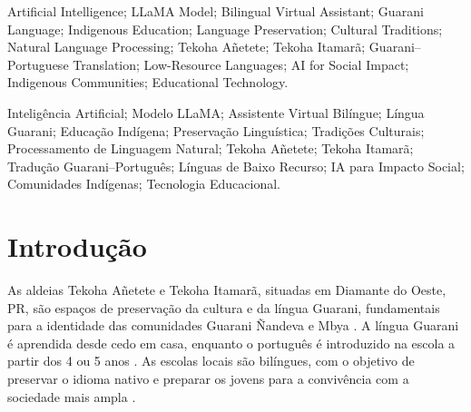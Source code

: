 \documentclass[10pt,conference]{IEEEtran}
\begin{document}
\renewcommand{\IEEEkeywordsname}{Keywords}
\begin{IEEEkeywords}
Artificial Intelligence; LLaMA Model; Bilingual Virtual Assistant; Guarani Language; Indigenous Education; Language Preservation; Cultural Traditions; Natural Language Processing; Tekoha Añetete; Tekoha Itamarã; Guarani–Portuguese Translation; Low-Resource Languages; AI for Social Impact; Indigenous Communities; Educational Technology.
\end{IEEEkeywords}

\renewcommand{\abstractname}{Resumo}

\begin{abstract}
O desenvolvimento da Inteligência Artificial está modificando a forma como as pessoas interagem com a tecnologia. Em todos os lugares, há uma enxurrada de modelos treinados e disponíveis para uso. Diante dos desafios enfrentados pelas comunidades indígenas, em especial a preservação da língua e das tradições culturais, surge a oportunidade de utilizar a IA, como o modelo LLaMA, no ensino e na preservação da língua e cultura indígena \cite{deferia2024uso}. Este estudo explora o uso do LLaMA no desenvolvimento de um assistente virtual bilíngue (Guarani-Português) dedicado à língua e às tradições Guarani com o objetivo de apoiar o ensino de crianças e jovens, com foco nas aldeias Tekoha Añetete e Tekoha Itamarã, localizadas em Diamante do Oeste, Paraná \cite{cabral2016guarani, kuhl2013etno}.
\end{abstract}

\renewcommand\IEEEkeywordsname{Palavras-chave}

\begin{IEEEkeywords}
Inteligência Artificial; Modelo LLaMA; Assistente Virtual Bilíngue; Língua Guarani; Educação Indígena; Preservação Linguística; Tradições Culturais; Processamento de Linguagem Natural; Tekoha Añetete; Tekoha Itamarã; Tradução Guarani–Português; Línguas de Baixo Recurso; IA para Impacto Social; Comunidades Indígenas; Tecnologia Educacional.
\end{IEEEkeywords}

\IEEEpeerreviewmaketitle

\section{Introdução} 
As aldeias Tekoha Añetete e Tekoha Itamarã, situadas em Diamante do Oeste, PR, são espaços de preservação da cultura e da língua Guarani, fundamentais para a identidade das comunidades Guarani Ñandeva e Mbya \cite{mendonca2019atitudes}. A língua Guarani é aprendida desde cedo em casa, enquanto o português é introduzido na escola a partir dos 4 ou 5 anos \cite{funai2018licoes}. As escolas locais são bilíngues, com o objetivo de preservar o idioma nativo e preparar os jovens para a convivência com a sociedade mais ampla \cite{ibge2023censo}.
\end{document}
